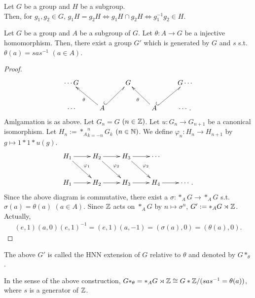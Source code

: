\begin{proposition}
  \label{subgr}
  Let $G$ be a group and $H$ be a subgroup. \\
  Then, for $g_1,g_2 \in G$, $g_1H=g_2H \Leftrightarrow g_1 H \cap g_2 H \Leftrightarrow g_1^{-1}g_2 \in H$.
\end{proposition}

\begin{theorem}
  Let $G$ be a group and $A$ be a subgroup of $G$.
  Let $\theta : A \rightarrow G$ be a injective homomorphism.
  Then, there exist a group $G'$ which is generated by $G$ and $s$ s.t. $\theta(a) = sas^{-1}$ $(a \in A)$.
\end{theorem}

\begin{proof}
    \[
  \xymatrix{
    \cdots G  &  & G & & G \cdots\\
   \cdots & A \ar[lu]^\theta \ar@{^{(}-_>}[ur] &  &A \ar[lu]^\theta \ar@{^{(}-_>}[ur] & \cdots.
  }
  \]
  Amlgamation is as above.
  Let $G_n = G$ $(n \in \mathbb{Z})$.
  Let $u : G_n \rightarrow G_{n+1}$ be a canonical isomorphism.
  Let $H_n := {*_A}_{k=-n}^n G_k$ $(n \in \mathbb{N})$.
  We define $\varphi_n : H_n \rightarrow H_{n+1}$ by $g \mapsto 1*1*u(g)$.
  \[
  \xymatrix{
    H_1 \ar[r] \ar[dr]^{\varphi_1} & H_2 \ar[r] \ar[dr]^{\varphi_2} & H_3 \ar[r] \ar[dr]^{\varphi_2} & \cdots\\
    H_1 \ar[r] & H_2 \ar[r]  &H_3 \ar[r] & H_4 \ar[r] & \cdots.
  }
  \]
  Since the above diagram is commutative, there exist a $\sigma : *_A G \rightarrow *_A G$ s.t. $\sigma(a) = \theta(a)$ $(a \in A)$.
  Since $\mathbb{Z}$ acts on $*_AG$ by $n \mapsto \sigma^n$, $G':= *_A G \rtimes \mathbb{Z}$.
  Actually,
  \begin{align*}
    (e,1)(a,0)(e,1)^{-1} = (e,1)(a,-1) = (\sigma(a),0) = (\theta(a),0).
  \end{align*}
\end{proof}

\begin{definition}
  The above $G'$ is called the HNN extension of $G$ relative to $\theta$ and denoted by $G*_\theta$.
\end{definition}

\begin{remark}\label{hnniso}
  In the sense of the above construction, $G*_\theta = *_A G \rtimes \mathbb{Z} \cong G*\mathbb{Z}/(sas^{-1}=\theta(a))$, where $s$ is a generator of $\mathbb{Z}$.
\end{remark}

